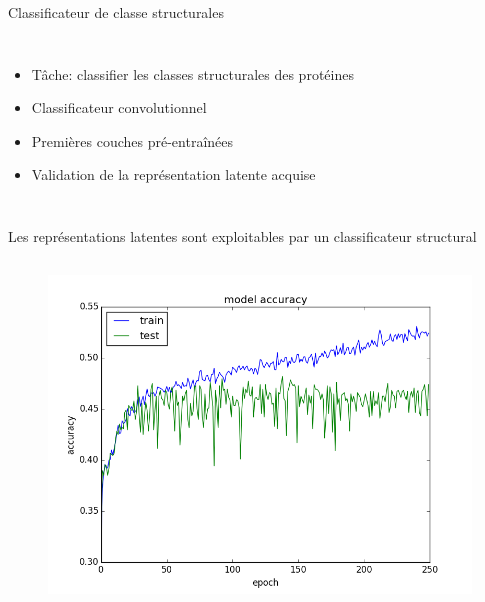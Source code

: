 \documentclass{beamer}
\begin{document}
\begin{frame}{Classificateur de classe structurales}
\begin{columns}
    \begin{itemize}
    \item Tâche: classifier les classes structurales des protéines
    \item Classificateur convolutionnel
    \item Premières couches pré-entraînées
    \item Validation de la représentation latente acquise
    \end{itemize}
  \end{columns}

 \end{frame}


\begin{frame}{Les représentations latentes sont exploitables par un
    classificateur structural}

  \begin{columns}
    \begin{figure}
      \centering
      \includegraphics[scale=0.25]{../Figures/SupClass}
    \end{figure}


\end{columns}
\end{frame}
\end{document}
